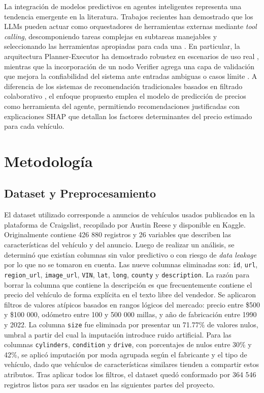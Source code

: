 \documentclass[conference]{IEEEtran}
\begin{document}
La integración de modelos predictivos en agentes inteligentes representa una tendencia emergente en la literatura. Trabajos recientes han demostrado que los LLMs pueden actuar como orquestadores de herramientas externas mediante \textit{tool calling}, descomponiendo tareas complejas en subtareas manejables y seleccionando las herramientas apropiadas para cada una \cite{schick2023, masterman2024}. En particular, la arquitectura Planner-Executor ha demostrado robustez en escenarios de uso real \cite{dong2025}, mientras que la incorporación de un nodo Verifier agrega una capa de validación que mejora la confiabilidad del sistema ante entradas ambiguas o casos límite \cite{chu2024}. A diferencia de los sistemas de recomendación tradicionales basados en filtrado colaborativo \cite{aggarwal2016}, el enfoque propuesto emplea el modelo de predicción de precios como herramienta del agente, permitiendo recomendaciones justificadas con explicaciones SHAP que detallan los factores determinantes del precio estimado para cada vehículo.

\section{Metodología}
\label{sec:metodologia}

\subsection{Dataset y Preprocesamiento}
\label{subsec:dataset}
El dataset utilizado corresponde a anuncios de vehículos usados publicados en la plataforma de Craigslist, recopilado por Austin Reese y disponible en Kaggle. Originalmente contiene 426 880 registros y 26 variables que describen las características del vehículo y del anuncio. Luego de realizar un análisis, se determinó que existían columnas sin valor predictivo o con riesgo de \textit{data leakage} por lo que no se tomaron en cuenta. Las nueve columnas eliminadas son: \texttt{id}, \texttt{url}, \texttt{region\_url}, \texttt{image\_url}, \texttt{VIN}, \texttt{lat}, \texttt{long}, \texttt{county} y \texttt{description}. La razón para borrar la columna que contiene la descripción es que frecuentemente contiene el precio del vehículo de forma explícita en el texto libre del vendedor. Se aplicaron filtros de valores atípicos basados en rangos lógicos del mercado: precio entre \$500 y \$100 000, odómetro entre 100 y 500 000 millas, y año de fabricación entre 1990 y 2022. La columna \texttt{size} fue eliminada por presentar un 71.77\% de valores nulos, umbral a partir del cual la imputación introduce ruido artificial. Para las columnas \texttt{cylinders}, \texttt{condition} y \texttt{drive}, con porcentajes de nulos entre 30\% y 42\%, se aplicó imputación por moda agrupada según el fabricante y el tipo de vehículo, dado que vehículos de características similares tienden a compartir estos atributos. Tras aplicar todos los filtros, el dataset quedó conformado por 364 546 registros listos para ser usados en las siguientes partes del proyecto.
\end{document}
